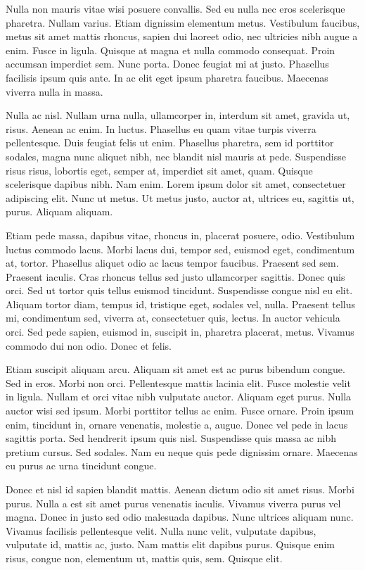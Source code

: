 \documentclass{article}
\begin{document}
Nulla non mauris vitae wisi posuere convallis. Sed eu nulla nec eros
scelerisque pharetra. Nullam varius. Etiam dignissim elementum metus.
Vestibulum faucibus, metus sit amet mattis rhoncus, sapien dui laoreet odio,
nec ultricies nibh augue a enim. Fusce in ligula. Quisque at magna et nulla
commodo consequat. Proin accumsan imperdiet sem. Nunc porta. Donec feugiat mi
at justo. Phasellus facilisis ipsum quis ante. In ac elit eget ipsum pharetra
faucibus. Maecenas viverra nulla in massa.

Nulla ac nisl. Nullam urna nulla, ullamcorper in, interdum sit amet, gravida
ut, risus. Aenean ac enim. In luctus. Phasellus eu quam vitae turpis viverra
pellentesque. Duis feugiat felis ut enim. Phasellus pharetra, sem id porttitor
sodales, magna nunc aliquet nibh, nec blandit nisl mauris at pede. Suspendisse
risus risus, lobortis eget, semper at, imperdiet sit amet, quam. Quisque
scelerisque dapibus nibh. Nam enim. Lorem ipsum dolor sit amet, consectetuer
adipiscing elit. Nunc ut metus. Ut metus justo, auctor at, ultrices eu,
sagittis ut, purus. Aliquam aliquam.

Etiam pede massa, dapibus vitae, rhoncus in, placerat posuere, odio.
Vestibulum luctus commodo lacus. Morbi lacus dui, tempor sed, euismod eget,
condimentum at, tortor. Phasellus aliquet odio ac lacus tempor faucibus.
Praesent sed sem. Praesent iaculis. Cras rhoncus tellus sed justo ullamcorper
sagittis. Donec quis orci. Sed ut tortor quis tellus euismod tincidunt.
Suspendisse congue nisl eu elit. Aliquam tortor diam, tempus id, tristique
eget, sodales vel, nulla. Praesent tellus mi, condimentum sed, viverra at,
consectetuer quis, lectus. In auctor vehicula orci. Sed pede sapien, euismod
in, suscipit in, pharetra placerat, metus. Vivamus commodo dui non odio. Donec
et felis.

Etiam suscipit aliquam arcu. Aliquam sit amet est ac purus bibendum congue.
Sed in eros. Morbi non orci. Pellentesque mattis lacinia elit. Fusce molestie
velit in ligula. Nullam et orci vitae nibh vulputate auctor. Aliquam eget
purus. Nulla auctor wisi sed ipsum. Morbi porttitor tellus ac enim. Fusce
ornare. Proin ipsum enim, tincidunt in, ornare venenatis, molestie a, augue.
Donec vel pede in lacus sagittis porta. Sed hendrerit ipsum quis nisl.
Suspendisse quis massa ac nibh pretium cursus. Sed sodales. Nam eu neque quis
pede dignissim ornare. Maecenas eu purus ac urna tincidunt congue.

Donec et nisl id sapien blandit mattis. Aenean dictum odio sit amet risus.
Morbi purus. Nulla a est sit amet purus venenatis iaculis. Vivamus viverra
purus vel magna. Donec in justo sed odio malesuada dapibus. Nunc ultrices
aliquam nunc. Vivamus facilisis pellentesque velit. Nulla nunc velit, vulputate
dapibus, vulputate id, mattis ac, justo. Nam mattis elit dapibus purus. Quisque
enim risus, congue non, elementum ut, mattis quis, sem. Quisque elit.
\end{document}
